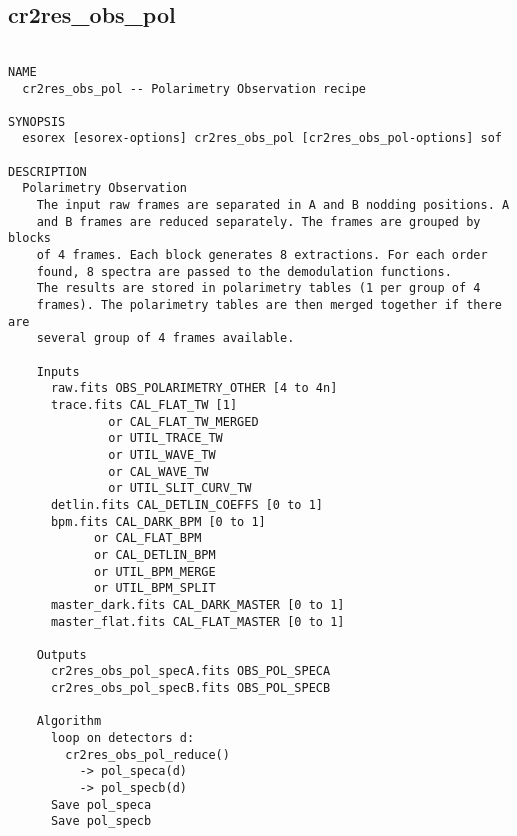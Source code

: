 \subsection{cr2res\_obs\_pol}
\begin{verbatim}

NAME
  cr2res_obs_pol -- Polarimetry Observation recipe

SYNOPSIS
  esorex [esorex-options] cr2res_obs_pol [cr2res_obs_pol-options] sof

DESCRIPTION
  Polarimetry Observation                                                 
    The input raw frames are separated in A and B nodding positions. A    
    and B frames are reduced separately. The frames are grouped by blocks 
    of 4 frames. Each block generates 8 extractions. For each order       
    found, 8 spectra are passed to the demodulation functions.            
    The results are stored in polarimetry tables (1 per group of 4        
    frames). The polarimetry tables are then merged together if there are 
    several group of 4 frames available.                                  
                                                                          
    Inputs                                                                
      raw.fits OBS_POLARIMETRY_OTHER [4 to 4n]             
      trace.fits CAL_FLAT_TW [1]                       
              or CAL_FLAT_TW_MERGED                    
              or UTIL_TRACE_TW                         
              or UTIL_WAVE_TW                          
              or CAL_WAVE_TW                           
              or UTIL_SLIT_CURV_TW                     
      detlin.fits CAL_DETLIN_COEFFS [0 to 1]           
      bpm.fits CAL_DARK_BPM [0 to 1]                   
            or CAL_FLAT_BPM                            
            or CAL_DETLIN_BPM                          
            or UTIL_BPM_MERGE                          
            or UTIL_BPM_SPLIT                          
      master_dark.fits CAL_DARK_MASTER [0 to 1]        
      master_flat.fits CAL_FLAT_MASTER [0 to 1]        
                                                                          
    Outputs                                                               
      cr2res_obs_pol_specA.fits OBS_POL_SPECA          
      cr2res_obs_pol_specB.fits OBS_POL_SPECB          
                                                                          
    Algorithm                                                             
      loop on detectors d:                                                
        cr2res_obs_pol_reduce()                                           
          -> pol_speca(d)                                                 
          -> pol_specb(d)                                                 
      Save pol_speca                                                      
      Save pol_specb                                                      
                                                                          

\end{verbatim}
